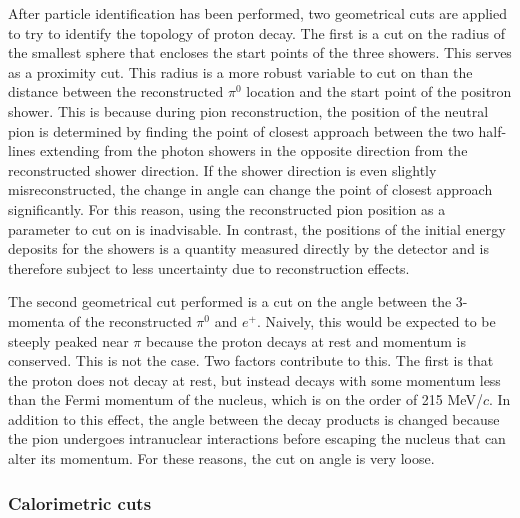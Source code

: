 \documentclass[a4paper, 10pt]{article}
\begin{document}
After particle identification has been performed, two geometrical cuts are applied to try to identify the topology of proton decay. The first is a cut on the radius of the smallest sphere that encloses the start points of the three showers. This serves as a proximity cut. This radius is a more robust variable to cut on than the distance between the reconstructed $\pi^{0}$ location and the start point of the positron shower. This is because during pion reconstruction, the position of the neutral pion is determined by finding the point of closest approach between the two half-lines extending from the photon showers in the opposite direction from the reconstructed shower direction. If the shower direction is even slightly misreconstructed, the change in angle can change the point of closest approach significantly. For this reason, using the reconstructed pion position as a parameter to cut on is inadvisable. In contrast, the positions of the initial energy deposits for the showers is a quantity measured directly by the detector and is therefore subject to less uncertainty due to reconstruction effects.

The second geometrical cut performed is a cut on the angle between the 3-momenta of the reconstructed $\pi^{0}$ and $e^{+}$. Naively, this would be expected to be steeply peaked near $\pi$ because the proton decays at rest and momentum is conserved. This is not the case. Two factors contribute to this. The first is that the proton does not decay at rest, but instead decays with some momentum less than the Fermi momentum of the nucleus, which is on the order of 215 MeV/$c$.  In addition to this effect, the angle between the decay products is changed because the pion undergoes intranuclear interactions before escaping the nucleus that can alter its momentum. For these reasons, the cut on angle is very loose.


\subsubsection{Calorimetric cuts}
\end{document}
